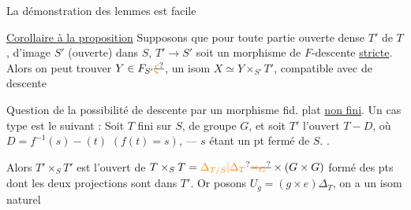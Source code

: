 
La démonstration des lemmes est facile

\uline{Corollaire à la proposition} Supposons que pour toute partie ouverte dense $T'$ de $T$, d'image $S'$ (ouverte) dans $S$, $T'\to S'$ soit un morphisme de $F$-descente \uline{stricte}. Alors on peut trouver  $Y\in F_{S'}\deleted{\unsure{\xi}}$,  un isom $X\simeq Y\times_{S'}T'$, compatible avec  de descente

Question de la possibilité de descente par un morphisme fid. plat \uline{non fini}. Un cas type est le suivant : Soit $T$   fini sur $S$, de groupe $G$, et  soit $T'$ l'ouvert  $T-D$, où $D=f^{-1}(s)-(t)$ $(f(t)=s)$, --- $s$ étant un pt fermé de $S$. .


Alors $T'\times_S T'$ est l'ouvert de $T\times_S T=\unsure{\Delta_{T/S}|\Delta_T}\deleted{\unsure{\times_G}}\times(G\times G)$ formé des pts dont les deux projections sont dans $T'$. Or posons $U_g=(g\times e)\Delta_T$,  on a un isom naturel
 

